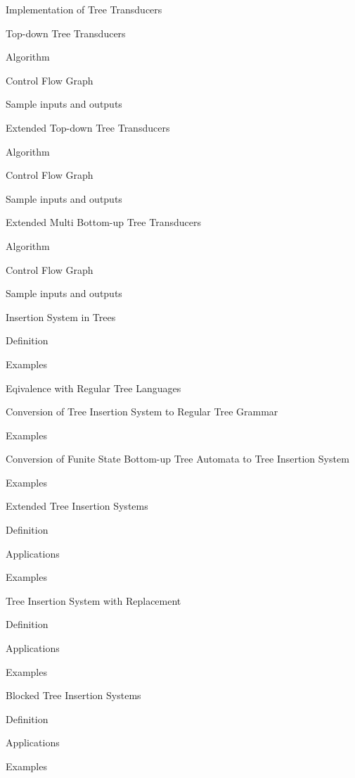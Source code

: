 
Implementation of Tree Transducers

	Top-down Tree Transducers

		Algorithm

		Control Flow Graph

		Sample inputs and outputs

	Extended Top-down Tree Transducers

		Algorithm

		Control Flow Graph

		Sample inputs and outputs

	Extended Multi Bottom-up Tree Transducers

		Algorithm

		Control Flow Graph

		Sample inputs and outputs

Insertion System in Trees

	Definition

	Examples

	Eqivalence with Regular Tree Languages

		Conversion of Tree Insertion System to Regular Tree Grammar

			Examples 

		Conversion of Funite State Bottom-up Tree Automata to Tree Insertion System 

			Examples

	Extended Tree Insertion Systems

		Definition

		Applications

		Examples

	Tree Insertion System with Replacement

		Definition

		Applications

		Examples

	Blocked Tree Insertion Systems

		Definition

		Applications

		Examples
	
